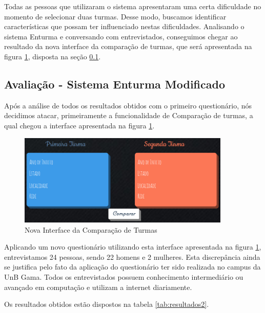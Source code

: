 Todas as pessoas que utilizaram o sistema apresentaram uma certa dificuldade no momento de selecionar duas turmas. Desse modo, buscamos identificar características que possam ter influenciado nestas dificuldades. Analisando o sistema Enturma e conversando com entrevistados, conseguimos chegar ao resultado da nova interface da comparação de turmas, que será apresentada na figura \ref{img:novaComparacao}, disposta na seção \ref{sub:avalia_o_sistema_enturma_}.


\subsection{Avaliação - Sistema Enturma Modificado} %
\label{sub:avalia_o_sistema_enturma_}

Após a análise de todos os resultados obtidos com o primeiro questionário, nós decidimos atacar, primeiramente a funcionalidade de Comparação de turmas, a qual chegou a interface apresentada na figura \ref{img:novaComparacao}.

\begin{figure}[H]
	\centering
	\includegraphics[width=0.9\textwidth]{imagens/novoComparar}
	\caption{Nova Interface da Comparação de Turmas}
	\label{img:novaComparacao}
\end{figure}

Aplicando um novo questionário utilizando esta interface apresentada na figura \ref{img:novaComparacao}, entrevistamos 24 pessoas, sendo 22 homens e 2 mulheres. Esta discrepância ainda se justifica pelo fato da aplicação do questionário ter sido realizada no campus da UnB Gama. Todos os entrevistados possuem conhecimento intermediário ou avançado em computação e utilizam a internet diariamente. 

Os resultados obtidos estão dispostos na tabela \ref{tab:resultados2}. 


